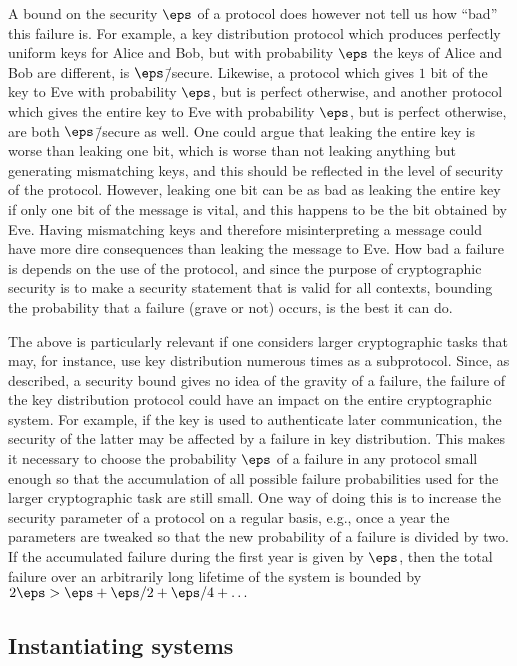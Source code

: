 A bound on the security $\eps$ of a protocol does however not tell us how ``bad'' this failure is. For example, a key distribution protocol which produces perfectly uniform keys for Alice and Bob, but with probability $\eps$ the keys of Alice and Bob are different, is $\eps$\=/secure. Likewise, a protocol which gives $1$ bit of the key to Eve with probability $\eps$, but is perfect otherwise, and another protocol which gives the entire key to Eve with probability $\eps$, but is perfect otherwise, are both $\eps$\=/secure as well. One could argue that leaking the entire key is worse than leaking one bit, which is worse than not leaking anything but generating mismatching keys, and this should be reflected in the level of security of the protocol. However, leaking one bit can be as bad as leaking the entire key if only one bit of the message is vital, and this happens to be the bit obtained by Eve. Having mismatching keys and therefore misinterpreting a message could have more dire consequences than leaking the message to Eve. How bad a failure is depends on the use of the protocol, and since the purpose of cryptographic security is to make a security statement that is valid for all contexts, bounding the probability that a failure (grave or not) occurs, is the best it can do.

The above is particularly relevant if one considers larger cryptographic tasks that may, for instance, use key distribution numerous times as a subprotocol. Since, as described, a security bound gives no idea of the gravity of a failure, the failure of the key distribution protocol could have an impact on the entire cryptographic system. For example, if the key is used to authenticate later communication, the security of the latter may  be affected by a failure in key distribution. This makes it necessary to choose the probability $\eps$ of a failure in any protocol small enough so that the accumulation of all possible failure probabilities used for the larger cryptographic task are still small.  One way of doing this is to increase the security parameter of a protocol on a regular basis, e.g., once a year the parameters are tweaked so that the new probability of a failure is divided by two. If the accumulated failure during the first year is given by $\eps$, then the total failure over an arbitrarily long lifetime of the system is bounded by $2\eps > \eps + \eps/2 + \eps/4 + \dotsc$


\subsection{Instantiating systems}
\label{sec:ac.instantiating}

